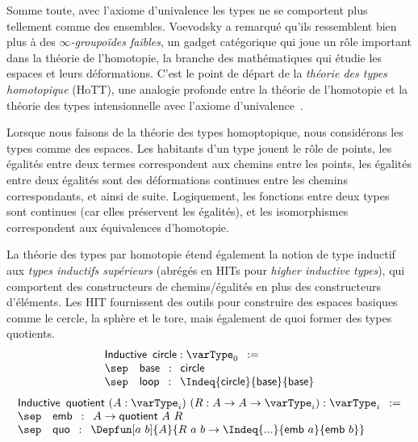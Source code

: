 Somme toute, avec l'axiome d'univalence les types ne se comportent plus 
tellement comme des ensembles. 
% 
Voevodsky a remarqué qu'ils ressemblent bien plus à des 
\emph{\( \infty \)-groupoïdes faibles}, un gadget catégorique qui joue un rôle 
important dans la théorie de l'homotopie, la branche des mathématiques qui 
étudie les espaces et leurs déformations. 
% 
C'est le point de départ de la \emph{théorie des types homotopique} (HoTT), une 
analogie profonde entre la théorie de l'homotopie et la théorie des types 
intensionnelle avec l'axiome d'univalence~\cite{hottbook}.

Lorsque nous faisons de la théorie des types homoptopique, nous considérons les 
types comme des espaces. Les habitants d'un type jouent le rôle de points, 
les égalités entre deux termes correspondent aux chemins entre les points, les 
égalités entre deux égalités sont des déformations continues entre les chemins 
correspondants, et ainsi de suite. 
% 
Logiquement, les fonctions entre deux types sont continues (car elles
préservent les égalités), et les isomorphismes correspondent aux équivalences 
d'homotopie. 

La théorie des types par homotopie étend également la notion de type inductif 
aux \emph{types inductifs supérieurs} (abrégés en HITs pour \emph{higher inductive types}), 
qui comportent des constructeurs de chemins/égalités en plus des constructeurs d'éléments. 
% 
Les HIT fournissent des outils pour construire des espaces basiques comme le cercle, 
la sphère et le tore, mais également de quoi former des types quotients.
% 
\[
\begin{array}{l}
\mathsf{Inductive}\enskip\mathsf{circle} : \varType_0\enskip := \\
\sep \quad \mathsf{base} \enskip : \enskip \mathsf{circle}\\
\sep \quad \mathsf{loop} \enskip : \enskip \Indeq{\mathsf{circle}}{\mathsf{base}}{\mathsf{base}} \\
\end{array}
\]
\[
\begin{array}{l}
\mathsf{Inductive}\enskip\mathsf{quotient}\ (A : \varType_i)\ (R : A \to A \to \varType_i) : \varType_i\enskip := \\
\sep \quad \mathsf{emb} \enskip : \enskip A \to \mathsf{quotient}\ A\ R \\
\sep \quad \mathsf{quo} \enskip : \enskip \Depfun[a\ b]{A}{R\ a\ b \to \Indeq{...}{\mathsf{emb}\ a}{\mathsf{emb}\ b}} \\
\end{array}
\]

